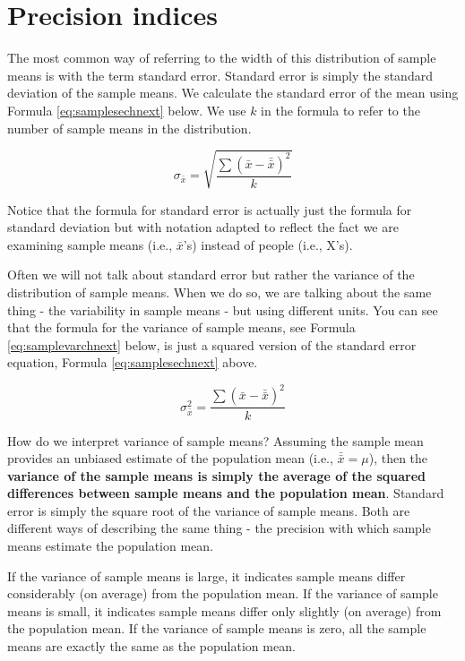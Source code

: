\documentclass[
]{krantz}
\begin{document}
\hypertarget{precision-indices}{%
\section{Precision indices}\label{precision-indices}}

The most common way of referring to the width of this distribution of sample means is with the term standard error. Standard error is simply the standard deviation of the sample means. We calculate the standard error of the mean using Formula \eqref{eq:samplesechnext} below. We use \(k\) in the formula to refer to the number of sample means in the distribution.

\begin{equation} 
\sigma_{\bar{x}} = \sqrt{\frac{\sum{(\bar{x} - \bar{\bar{x}})^2}}{k}}
      \label{eq:samplesechnext}
\end{equation}

Notice that the formula for standard error is actually just the formula for standard deviation but with notation adapted to reflect the fact we are examining sample means (i.e., \(\bar{x}\)'s) instead of people (i.e., X's).

Often we will not talk about standard error but rather the variance of the distribution of sample means. When we do so, we are talking about the same thing - the variability in sample means - but using different units. You can see that the formula for the variance of sample means, see Formula \eqref{eq:samplevarchnext} below, is just a squared version of the standard error equation, Formula \eqref{eq:samplesechnext} above.

\begin{equation} 
\sigma_{\bar{x}}^2 = \frac{\sum{(\bar{x} - \bar{\bar{x}})^2}}{k}
      \label{eq:samplevarchnext}
\end{equation}

How do we interpret variance of sample means? Assuming the sample mean provides an unbiased estimate of the population mean (i.e., \(\bar{\bar{x}} = \mu\)), then the \textbf{variance of the sample means is simply the average of the squared differences between sample means and the population mean}. Standard error is simply the square root of the variance of sample means. Both are different ways of describing the same thing - the precision with which sample means estimate the population mean.

If the variance of sample means is large, it indicates sample means differ considerably (on average) from the population mean. If the variance of sample means is small, it indicates sample means differ only slightly (on average) from the population mean. If the variance of sample means is zero, all the sample means are exactly the same as the population mean.
\end{document}
